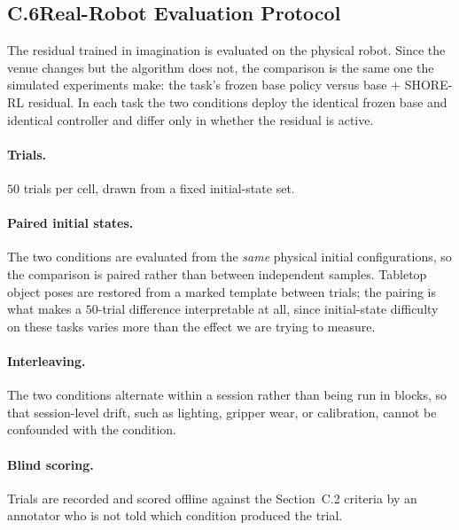 \documentclass[letterpaper]{article} %
\newcounter{algorithm}
\begin{document}
\subsection{C.6\quad Real-Robot Evaluation Protocol}

The residual trained in imagination is evaluated on the physical robot. Since
the venue changes but the algorithm does not, the comparison is the same one the
simulated experiments make: the task's frozen base policy versus base $+$
SHORE-RL residual. In each task the two conditions deploy the identical frozen base
and identical controller and differ only in whether the residual is active.

\paragraph{Trials.}
$50$ trials per cell, drawn from a fixed initial-state set.

\paragraph{Paired initial states.}
The two conditions are evaluated from the \emph{same} physical initial configurations,
so the comparison is paired rather than between independent samples. Tabletop
object poses are restored from a marked template between trials; the pairing is
what makes a $50$-trial difference interpretable at all, since initial-state
difficulty on these tasks varies more than the effect we are trying to measure.

\paragraph{Interleaving.}
The two conditions alternate within a session rather than being run in blocks, so that
session-level drift, such as lighting, gripper wear, or calibration, cannot be confounded
with the condition.

\paragraph{Blind scoring.}
Trials are recorded and scored offline against the Section~C.2 criteria by an
annotator who is not told which condition produced the trial.
\end{document}
